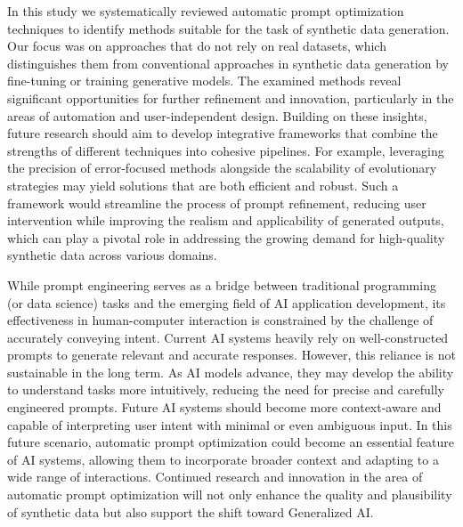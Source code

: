 \documentclass[runningheads]{llncs}
\begin{document}
In this study we systematically reviewed automatic prompt optimization techniques to identify methods suitable for the task of synthetic data generation. Our focus was on approaches that do not rely on real datasets, which distinguishes them from conventional approaches in synthetic data generation by fine-tuning or training generative models. The examined methods reveal significant opportunities for further refinement and innovation, particularly in the areas of automation and user-independent design. Building on these insights, future research should aim to develop integrative frameworks that combine the strengths of different techniques into cohesive pipelines. For example, leveraging the precision of error-focused methods alongside the scalability of evolutionary strategies may yield solutions that are both efficient and robust. Such a framework would streamline the process of prompt refinement, reducing user intervention while improving the realism and applicability of generated outputs, which can play a pivotal role in addressing the growing demand for high-quality synthetic data across various domains.

While prompt engineering serves as a bridge between traditional programming (or data science) tasks and the emerging field of AI application development, its effectiveness in human-computer interaction is constrained by the challenge of accurately conveying intent. Current AI systems heavily rely on well-constructed prompts to generate relevant and accurate responses. However, this reliance is not sustainable in the long term. As AI models advance, they may develop the ability to understand tasks more intuitively, reducing the need for precise and carefully engineered prompts. Future AI systems should become more context-aware and capable of interpreting user intent with minimal or even ambiguous input. In this future scenario, automatic prompt optimization could become an essential feature of AI systems, allowing them to incorporate broader context and adapting to a wide range of interactions. Continued research and innovation in the area of automatic prompt optimization will not only enhance the quality and plausibility of synthetic data but also support the shift toward Generalized AI.


%
%
%


%
%
%
\end{document}
